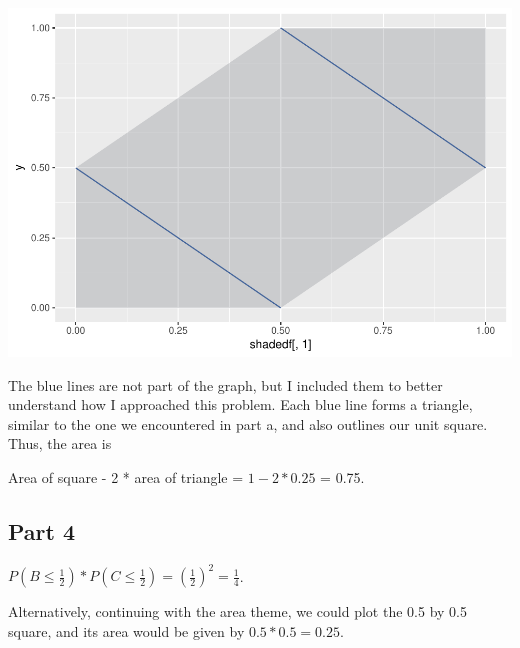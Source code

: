 \documentclass[]{article}
\newenvironment{Shaded}{\begin{snugshade}}{\end{snugshade}}
\newcommand{\KeywordTok}[1]{\textcolor[rgb]{0.13,0.29,0.53}{\textbf{#1}}}
\newcommand{\DataTypeTok}[1]{\textcolor[rgb]{0.13,0.29,0.53}{#1}}
\newcommand{\DecValTok}[1]{\textcolor[rgb]{0.00,0.00,0.81}{#1}}
\newcommand{\FloatTok}[1]{\textcolor[rgb]{0.00,0.00,0.81}{#1}}
\newcommand{\StringTok}[1]{\textcolor[rgb]{0.31,0.60,0.02}{#1}}
\newcommand{\OperatorTok}[1]{\textcolor[rgb]{0.81,0.36,0.00}{\textbf{#1}}}
\newcommand{\NormalTok}[1]{#1}
\begin{document}
\includegraphics{JSturm_Assignment5_files/figure-latex/unnamed-chunk-5-1.pdf}

The blue lines are not part of the graph, but I included them to better
understand how I approached this problem. Each blue line forms a
triangle, similar to the one we encountered in part a, and also outlines
our unit square. Thus, the area is

\center Area of square - 2 * area of triangle = \(1 - 2*0.25\) = 0.75.

\subsection{Part 4}\label{part-4-1}

\(P(B \leq \frac{1}{2})*P(C \leq \frac{1}{2}) = (\frac{1}{2})^{2} = \frac{1}{4}\).

Alternatively, continuing with the area theme, we could plot the 0.5 by
0.5 square, and its area would be given by \(0.5 * 0.5 = 0.25\).

\begin{Shaded}
\end{Shaded}
\end{document}
